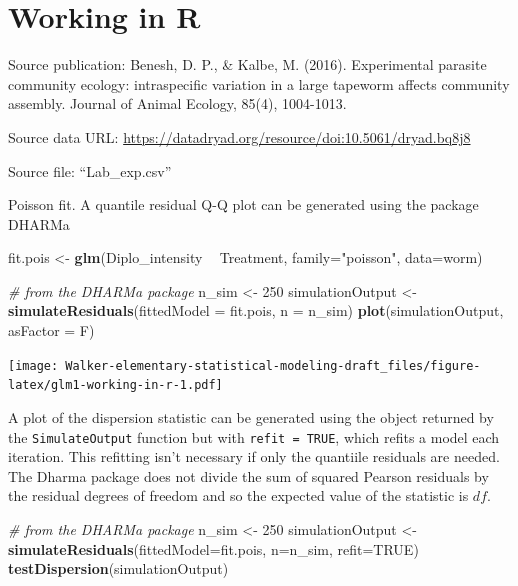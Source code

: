\documentclass[]{book}
\newenvironment{Shaded}{\begin{snugshade}}{\end{snugshade}}
\newcommand{\KeywordTok}[1]{\textcolor[rgb]{0.13,0.29,0.53}{\textbf{#1}}}
\newcommand{\DataTypeTok}[1]{\textcolor[rgb]{0.13,0.29,0.53}{#1}}
\newcommand{\DecValTok}[1]{\textcolor[rgb]{0.00,0.00,0.81}{#1}}
\newcommand{\StringTok}[1]{\textcolor[rgb]{0.31,0.60,0.02}{#1}}
\newcommand{\CommentTok}[1]{\textcolor[rgb]{0.56,0.35,0.01}{\textit{#1}}}
\newcommand{\OtherTok}[1]{\textcolor[rgb]{0.56,0.35,0.01}{#1}}
\newcommand{\OperatorTok}[1]{\textcolor[rgb]{0.81,0.36,0.00}{\textbf{#1}}}
\newcommand{\NormalTok}[1]{#1}
\begin{document}
\section{Working in R}\label{working-in-r-6}

Source publication: Benesh, D. P., \& Kalbe, M. (2016). Experimental
parasite community ecology: intraspecific variation in a large tapeworm
affects community assembly. Journal of Animal Ecology, 85(4), 1004-1013.

Source data URL:
\url{https://datadryad.org/resource/doi:10.5061/dryad.bq8j8}

Source file: ``Lab\_exp.csv''

Poisson fit. A quantile residual Q-Q plot can be generated using the
package DHARMa

\begin{Shaded}
\begin{Highlighting}[]
\NormalTok{fit.pois <-}\StringTok{ }\KeywordTok{glm}\NormalTok{(Diplo_intensity }\OperatorTok{~}\StringTok{ }\NormalTok{Treatment, }\DataTypeTok{family=}\StringTok{"poisson"}\NormalTok{, }\DataTypeTok{data=}\NormalTok{worm)}

\CommentTok{# from the DHARMa package}
\NormalTok{  n_sim <-}\StringTok{ }\DecValTok{250}
\NormalTok{  simulationOutput <-}\StringTok{ }\KeywordTok{simulateResiduals}\NormalTok{(}\DataTypeTok{fittedModel =}\NormalTok{ fit.pois, }\DataTypeTok{n =}\NormalTok{ n_sim)}
  \KeywordTok{plot}\NormalTok{(simulationOutput, }\DataTypeTok{asFactor =}\NormalTok{ F)}
\end{Highlighting}
\end{Shaded}

\texttt{[image: Walker-elementary-statistical-modeling-draft\_files/figure-latex/glm1-working-in-r-1.pdf]}

A plot of the dispersion statistic can be generated using the object
returned by the \texttt{SimulateOutput} function but with
\texttt{refit\ =\ TRUE}, which refits a model each iteration. This
refitting isn't necessary if only the quantiile residuals are needed.
The Dharma package does not divide the sum of squared Pearson residuals
by the residual degrees of freedom and so the expected value of the
statistic is \(df\).

\begin{Shaded}
\begin{Highlighting}[]
\CommentTok{# from the DHARMa package}
\NormalTok{  n_sim <-}\StringTok{ }\DecValTok{250}
\NormalTok{  simulationOutput <-}\StringTok{ }\KeywordTok{simulateResiduals}\NormalTok{(}\DataTypeTok{fittedModel=}\NormalTok{fit.pois, }\DataTypeTok{n=}\NormalTok{n_sim, }\DataTypeTok{refit=}\OtherTok{TRUE}\NormalTok{)}
  \KeywordTok{testDispersion}\NormalTok{(simulationOutput)}
\end{Highlighting}
\end{Shaded}
\end{document}
